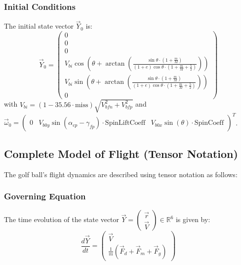 \documentclass[10pt,a4paper]{report}
\begin{document}
\subsubsection{Initial Conditions}
The initial state vector $\vec{Y}_0$ is:
\begin{equation}
    \vec{Y}_0 = \begin{pmatrix}
    0 \\
    0 \\
    0 \\
    V_{bi} \cos\left( \theta + \arctan\left( \frac{\sin \theta \cdot (1 + \frac{m}{M})}{(1 + e) \cos \theta \cdot (1 + \frac{m}{M} + \frac{5}{2})} \right) \right) \\
    V_{bi} \sin\left( \theta + \arctan\left( \frac{\sin \theta \cdot (1 + \frac{m}{M})}{(1 + e) \cos \theta \cdot (1 + \frac{m}{M} + \frac{5}{2})} \right) \right) \\
    0
    \end{pmatrix}
    \label{eq:initial_conditions}
\end{equation}
with $V_{bi} = (1 - 35.56 \cdot \text{miss}) \sqrt{V_{bfn}^2 + V_{bfp}^2}$ and $\vec{\omega}_0 = \begin{pmatrix} 0 & V_{b0y} \sin(\alpha_{cp} - \gamma_{fp}) \cdot \text{SpinLiftCoeff} & V_{b0x} \sin(\theta) \cdot \text{SpinCoeff} \end{pmatrix}^T$.

\subsection{Complete Model of Flight (Tensor Notation)}
The golf ball's flight dynamics are described using tensor notation as follows:

\subsubsection{Governing Equation}
The time evolution of the state vector $\vec{Y} = \begin{pmatrix} \vec{r} \\ \vec{V} \end{pmatrix} \in \mathbb{R}^6$ is given by:
\begin{equation}
    \frac{d\vec{Y}}{dt} = \begin{pmatrix}
    \vec{V} \\
    \frac{1}{m} \left( \vec{F}_d + \vec{F}_m + \vec{F}_g \right)
    \end{pmatrix}
    \label{eq:tensor_ode}
\end{equation}
\end{document}
